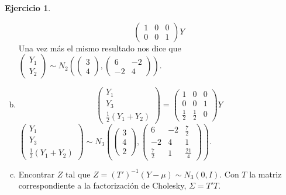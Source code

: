 \documentclass[12pt,spanish]{article}
\theoremstyle{definition}
\newtheorem{exercise}{Ejercicio}
\begin{document}
\begin{exercise}
\begin{enumerate}[a)]
\[\begin{pmatrix}
          1 & 0 & 0 \\
          0 & 0 & 1
        \end{pmatrix}Y\] Una vez más el mismo resultado nos dice
      que $\begin{pmatrix}
          Y_1 \\
          Y_2
        \end{pmatrix}\sim N_2\left(
        \begin{pmatrix}
          3 \\ 4
        \end{pmatrix},
        \begin{pmatrix}
          6 & -2 \\
          -2 & 4
        \end{pmatrix}\right)$.
      \item \[\begin{pmatrix}
          Y_1 \\
          Y_3 \\
          \frac{1}{2}(Y_1+Y_2)
        \end{pmatrix}
        =\begin{pmatrix}
          1 & 0 & 0 \\
          0 & 0 & 1 \\
          \frac{1}{2} & \frac{1}{2} & 0
        \end{pmatrix}Y\]
      $\begin{pmatrix}
         Y_1 \\
         Y_3 \\
         \frac{1}{2}(Y_1+Y_2)
        \end{pmatrix}\sim N_3\left(
        \begin{pmatrix}
          3 \\ 4 \\ 2
        \end{pmatrix},
        \begin{pmatrix}
          6 & -2 & \frac{7}{2} \\
          -2 & 4 & 1 \\
          \frac{7}{2} & 1 & \frac{21}{4}
        \end{pmatrix}\right)$.
    \item Encontrar $Z$ tal que $Z=(T')^{-1}(Y-\mu)\sim N_3(0,I)$. Con
      $T$ la matriz correspondiente a la factorización de Cholesky,
      $\Sigma=T'T$.


\end{enumerate}
\end{exercise}
\end{document}
